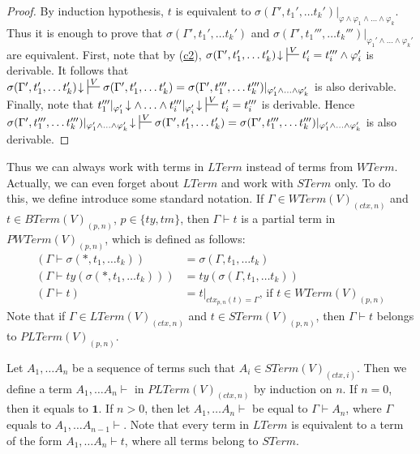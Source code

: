 \documentclass[reqno]{amsart}
\newcommand{\axref}[1]{(\hyperref[ax:#1]{#1})}
\theoremstyle{definition}
\theoremstyle{remark}
\newcommand{\emptyCtx}{\mathbf{1}}
\numberwithin{figure}{section}
\begin{document}
\begin{proof}
By induction hypothesis, $t$ is equivalent to $\sigma(\Gamma', t_1', \ldots t_k')|_{\varphi \land \varphi_1 \land \ldots \land \varphi_k}$.
Thus it is enough to prove that $\sigma(\Gamma', t_1', \ldots t_k')$ and $\sigma(\Gamma', t_1''', \ldots t_k''')|_{\varphi_1' \land \ldots \land \varphi_k'}$ are equivalent.
First, note that by \axref{c2}, $\sigma(\Gamma', t_1', \ldots t_k')\!\downarrow\ \sststile{}{V} t_i' = t_i''' \land \varphi_i'$ is derivable.
It follows that $\sigma(\Gamma', t_1', \ldots t_k')\!\downarrow\ \sststile{}{V} \sigma(\Gamma', t_1', \ldots t_k') = \sigma(\Gamma', t_1''', \ldots t_k''')|_{\varphi_1' \land \ldots \land \varphi_k'}$ is also derivable.
Finally, note that $t_1'''|_{\varphi_1'}\!\downarrow \land \ldots \land t_i'''|_{\varphi_i'}\!\downarrow\ \sststile{}{V} t_i' = t_i'''$ is derivable.
Hence $\sigma(\Gamma', t_1''', \ldots t_k''')|_{\varphi_1' \land \ldots \land \varphi_k'}\!\downarrow\ \sststile{}{V} \sigma(\Gamma', t_1', \ldots t_k') = \sigma(\Gamma', t_1''', \ldots t_k''')|_{\varphi_1' \land \ldots \land \varphi_k'}$ is also derivable.
\end{proof}

Thus we can always work with terms in $LTerm$ instead of terms from $WTerm$.
Actually, we can even forget about $LTerm$ and work with $STerm$ only.
To do this, we define introduce some standard notation.
If $\Gamma \in WTerm(V)_{(ctx,n)}$ and $t \in BTerm(V)_{(p,n)}$, $p \in \{ ty, tm \}$, then $\Gamma \vdash t$ is a partial term in $PWTerm(V)_{(p,n)}$, which is defined as follows:
\begin{align*}
(\Gamma \vdash \sigma(*, t_1, \ldots t_k)) & = \sigma(\Gamma, t_1, \ldots t_k) \\
(\Gamma \vdash ty(\sigma(*, t_1, \ldots t_k))) & = ty(\sigma(\Gamma, t_1, \ldots t_k)) \\
(\Gamma \vdash t) & = t|_{ctx_{p,n}(t) = \Gamma} \text{, if } t \in WTerm(V)_{(p,n)}
\end{align*}
Note that if $\Gamma \in LTerm(V)_{(ctx,n)}$ and $t \in STerm(V)_{(p,n)}$, then $\Gamma \vdash t$ belongs to $PLTerm(V)_{(p,n)}$.

Let $A_1, \ldots A_n$ be a sequence of terms such that $A_i \in STerm(V)_{(ctx,i)}$.
Then we define a term $A_1, \ldots A_n \vdash$ in $PLTerm(V)_{(ctx,n)}$ by induction on $n$.
If $n = 0$, then it equals to $\emptyCtx$.
If $n > 0$, then let $A_1, \ldots A_n \vdash$ be equal to $\Gamma \vdash A_n$, where $\Gamma$ equals to $A_1, \ldots A_{n-1} \vdash$.
Note that every term in $LTerm$ is equivalent to a term of the form $A_1, \ldots A_n \vdash t$, where all terms belong to $STerm$.
\end{document}
